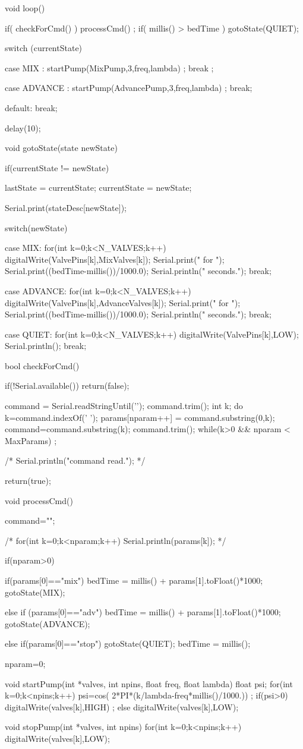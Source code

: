 void loop() {
  if( checkForCmd() ) processCmd()  ;
  if( millis() > bedTime ) gotoState(QUIET);

  switch (currentState) {
    case MIX :
      startPump(MixPump,3,freq,lambda) ;
      break ;

    case ADVANCE :
      startPump(AdvancePump,3,freq,lambda) ;
      break;

    default:
      break;
  }

  delay(10);
}


void gotoState(state newState)
{
  if(currentState != newState) {
    lastState = currentState;
    currentState = newState;

    Serial.print(stateDesc[newState]);

    switch(newState) {
      case MIX:
        for(int k=0;k<N_VALVES;k++) digitalWrite(ValvePins[k],MixValves[k]);
        Serial.print(" for ");
        Serial.print((bedTime-millis())/1000.0);
        Serial.println(" seconds.");
        break;

      case ADVANCE:
        for(int k=0;k<N_VALVES;k++) digitalWrite(ValvePins[k],AdvanceValves[k]);
        Serial.print(" for ");
        Serial.print((bedTime-millis())/1000.0);
        Serial.println(" seconds.");
        break;

      case QUIET:
        for(int k=0;k<N_VALVES;k++) digitalWrite(ValvePins[k],LOW);
        Serial.println();
        break;
    }


  }
}

bool checkForCmd()
{
   if(!Serial.available()) return(false);

   command = Serial.readStringUntil('\n');
   command.trim();
   int k;
   do {
      k=command.indexOf(' ');
      params[nparam++] = command.substring(0,k);
      command=command.substring(k);
      command.trim();
   } while(k>0 && nparam < MaxParams) ;

   /* Serial.println("command read."); */

   return(true);
}

void processCmd()
{

  command="";

  /* for(int k=0;k<nparam;k++) {
    Serial.println(params[k]);
  } */

  if(nparam>0) {

     if(params[0]=="mix") {
      bedTime = millis() + params[1].toFloat()*1000;
      gotoState(MIX);
    }

     else if (params[0]=="adv") {
      bedTime = millis() + params[1].toFloat()*1000;
      gotoState(ADVANCE);
     }

     else if(params[0]=="stop") {
      gotoState(QUIET);
      bedTime = millis();
     }

  }

  nparam=0;
}


void startPump(int *valves, int npins, float freq, float lambda)
{
  float psi;
  for(int k=0;k<npins;k++) {
    psi=cos( 2*PI*(k/lambda-freq*millis()/1000.)) ;
    if(psi>0)
        digitalWrite(valves[k],HIGH) ;
    else
      digitalWrite(valves[k],LOW);
  }
}

void stopPump(int *valves, int npins)
{
  for(int k=0;k<npins;k++)
    digitalWrite(valves[k],LOW);
}
